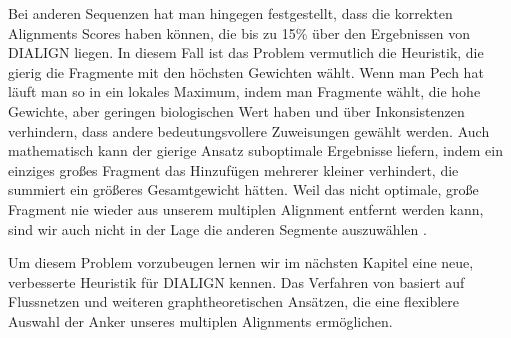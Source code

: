 Bei anderen Sequenzen hat man hingegen festgestellt, dass die korrekten Alignments Scores haben können, die bis zu 15\% über den Ergebnissen von DIALIGN liegen. In diesem Fall ist das Problem vermutlich die Heuristik, die gierig die Fragmente mit den höchsten Gewichten wählt. Wenn man Pech hat läuft man so in ein lokales Maximum, indem man Fragmente wählt, die hohe Gewichte, aber geringen biologischen Wert haben und über Inkonsistenzen verhindern, dass andere bedeutungsvollere Zuweisungen gewählt werden. Auch mathematisch kann der gierige Ansatz suboptimale Ergebnisse liefern, indem ein einziges großes Fragment das Hinzufügen mehrerer kleiner verhindert, die summiert ein größeres Gesamtgewicht hätten. Weil das nicht optimale, große Fragment nie wieder aus unserem multiplen Alignment entfernt werden kann, sind wir auch nicht in der Lage die anderen Segmente auszuwählen \cite{m99}. 

Um diesem Problem vorzubeugen lernen wir im nächsten Kapitel eine neue, verbesserte Heuristik für DIALIGN kennen. Das Verfahren von \cite{cpm10} basiert auf Flussnetzen und weiteren graphtheoretischen Ansätzen, die eine flexiblere Auswahl der Anker unseres multiplen Alignments ermöglichen.